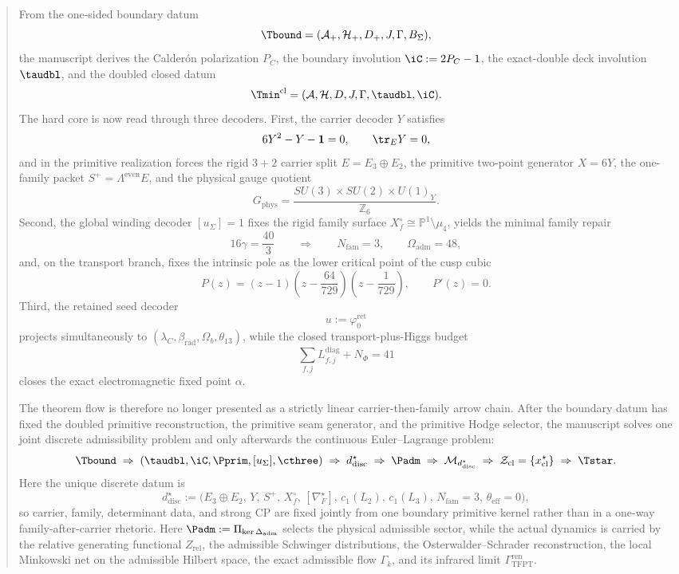 
\begin{abstract}
From the one-sided boundary datum
\[
\Tbound=(\mathcal A_+,\mathcal H_+,D_+,J,\Gamma,B_\Sigma),
\]
the manuscript derives the Calder\'on polarization $P_C$, the boundary involution
$\iC:=2P_C-1$, the exact-double deck involution $\taudbl$, and the doubled closed datum
\[
\Tmin^{\mathrm{cl}}=(\mathcal A,\mathcal H,D,J,\Gamma,\taudbl,\iC).
\]
The hard core is now read through three decoders. First, the carrier decoder $Y$ satisfies
\[
6Y^2-Y-\mathbf 1=0,
\qquad
\tr_EY=0,
\]
and in the primitive realization forces the rigid $3+2$ carrier split
$E=E_3\oplus E_2$, the primitive two-point generator $X=6Y$, the one-family packet
$S^+=\Lambda^{\mathrm{even}}E$, and the physical gauge quotient
\[
G_{\mathrm{phys}}
=
\frac{SU(3)\times SU(2)\times U(1)_Y}{\mathbb Z_6}.
\]
Second, the global winding decoder $[u_\Sigma]=1$ fixes the rigid family surface
$X_f^\circ\cong \mathbb P^1\setminus\mu_4$, yields the minimal family repair
\[
16\gamma=\frac{40}{3}
\qquad\Longrightarrow\qquad
N_{\mathrm{fam}}=3,
\qquad
\Omega_{\mathrm{adm}}=48,
\]
and, on the transport branch, fixes the intrinsic pole as the lower critical point of the cusp cubic
\[
P(z)=(z-1)\left(z-\frac{64}{729}\right)\left(z-\frac{1}{729}\right),
\qquad
P'(z)=0.
\]
Third, the retained seed decoder
\[
u:=\varphi_0^{\mathrm{ret}}
\]
projects simultaneously to $(\lambda_C,\beta_{\mathrm{rad}},\Omega_b,\theta_{13})$, while the
closed transport-plus-Higgs budget
\[
\sum_{f,j}L_{f,j}^{\mathrm{diag}}+N_\Phi=41
\]
closes the exact electromagnetic fixed point $\alpha$.

The theorem flow is therefore no longer presented as a strictly linear carrier-then-family arrow
chain. After the boundary datum has fixed the doubled primitive reconstruction, the primitive seam
generator, and the primitive Hodge selector, the manuscript solves one joint discrete admissibility
problem and only afterwards the continuous Euler--Lagrange problem:
\[
\Tbound
\;\Rightarrow\;
(\taudbl,\iC,\Pprim,[u_\Sigma],\cthree)
\;\Rightarrow\;
d^\star_{\mathrm{disc}}
\;\Rightarrow\;
\Padm
\;\Rightarrow\;
\mathcal M_{d^\star_{\mathrm{disc}}}
\;\Rightarrow\;
\mathcal Z_{\mathrm{cl}}=\{x^\star_{\mathrm{cl}}\}
\;\Rightarrow\;
\Tstar.
\]
Here the unique discrete datum is
\[
d^\star_{\mathrm{disc}}
:=
\bigl(
E_3\oplus E_2,\,
Y,\,
S^+,\,
X_f^\circ,\,
[\nabla_F^\star],\,
c_1(L_2),\,
c_1(L_3),\,
N_{\mathrm{fam}}=3,\,
\theta_{\mathrm{eff}}=0
\bigr),
\]
so carrier, family, determinant data, and strong CP are fixed jointly from one boundary primitive
kernel rather than in a one-way family-after-carrier rhetoric. Here $\Padm:=\Pi_{\ker
\Delta_{\mathrm{adm}}}$ selects the physical admissible sector, while the actual dynamics is
carried by the relative generating functional $Z_{\mathrm{rel}}$, the admissible Schwinger
distributions, the Osterwalder--Schrader reconstruction, the local Minkowski net on the admissible
Hilbert space, the exact admissible flow $\Gamma_k$, and its infrared limit
$\Gamma_{\mathrm{TFPT}}^{\mathrm{ren}}$.


\end{abstract}
